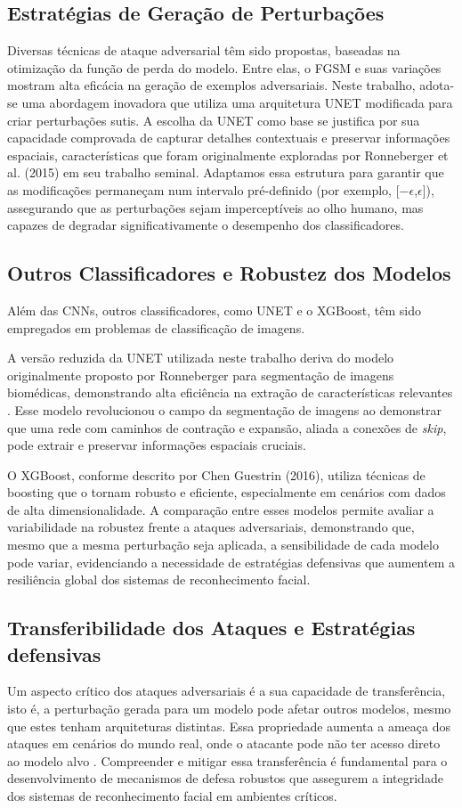\documentclass[12pt]{article}
\begin{document}
\subsection{Estratégias de Geração de Perturbações}
Diversas técnicas de ataque adversarial têm sido propostas, baseadas na
otimização da função de perda do modelo. Entre elas, o FGSM e suas variações
mostram alta eficácia na geração de exemplos adversariais. Neste trabalho,
adota-se uma abordagem inovadora que utiliza uma arquitetura UNET modificada
para criar perturbações sutis. A escolha da UNET como base se justifica por sua
capacidade comprovada de capturar detalhes contextuais e preservar informações
espaciais, características que foram originalmente exploradas por Ronneberger
et al. (2015) em seu trabalho seminal. Adaptamos essa estrutura para garantir
que as modificações permaneçam num intervalo pré-definido (por exemplo,
[$-\epsilon$,$\epsilon$]), assegurando que as perturbações sejam imperceptíveis
ao olho humano, mas capazes de degradar significativamente o desempenho dos
classificadores.

\subsection{Outros Classificadores e Robustez dos Modelos}
Além das CNNs, outros classificadores, como UNET e o XGBoost, têm sido
empregados em problemas de classificação de imagens.

A versão reduzida da UNET utilizada neste trabalho deriva do modelo
originalmente proposto por Ronneberger para segmentação de imagens biomédicas,
demonstrando alta eficiência na extração de características relevantes
\cite{ronneberger2015u}. Esse modelo revolucionou o campo da segmentação de
imagens ao demonstrar que uma rede com caminhos de contração e expansão, aliada
a conexões de \textit{skip}, pode extrair e preservar informações espaciais
cruciais.

O XGBoost, conforme descrito por Chen Guestrin (2016), utiliza técnicas de
boosting que o tornam robusto e eficiente, especialmente em cenários com dados
de alta dimensionalidade. A comparação entre esses modelos permite avaliar a
variabilidade na robustez frente a ataques adversariais, demonstrando que,
mesmo que a mesma perturbação seja aplicada, a sensibilidade de cada modelo
pode variar, evidenciando a necessidade de estratégias defensivas que aumentem
a resiliência global dos sistemas de reconhecimento facial.

\subsection{Transferibilidade dos Ataques e Estratégias defensivas}
Um aspecto crítico dos ataques adversariais é a sua capacidade de
transferência, isto é, a perturbação gerada para um modelo pode afetar outros
modelos, mesmo que estes tenham arquiteturas distintas. Essa propriedade
aumenta a ameaça dos ataques em cenários do mundo real, onde o atacante pode
não ter acesso direto ao modelo alvo \cite{tramer2021}. Compreender e mitigar essa transferência
é fundamental para o desenvolvimento de mecanismos de defesa robustos que
assegurem a integridade dos sistemas de reconhecimento facial em ambientes
críticos.
\end{document}
